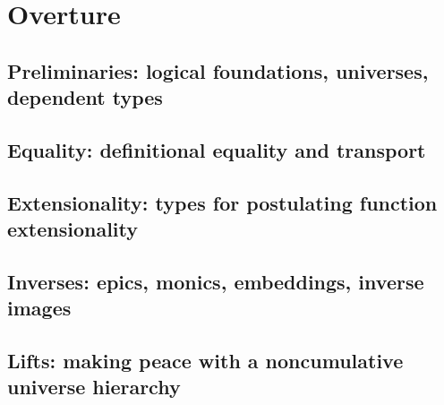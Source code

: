 \section{Overture}\label{sec:overture}

\subsection{Preliminaries: logical foundations, universes, dependent types}\label{preliminaries}


\subsection{Equality: definitional equality and transport}\label{equality}


\subsection{Extensionality: types for postulating function extensionality}\label{function-extensionality}


\subsection{Inverses: epics, monics, embeddings, inverse images}\label{sec:inverse-image-invers}


\subsection{Lifts: making peace with a noncumulative universe hierarchy}\label{sec:lifts-altern-univ}

